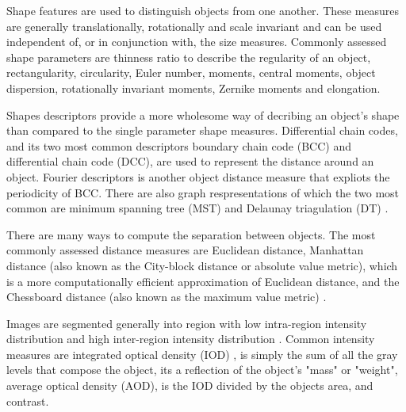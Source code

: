 \begin{definition}
	Shape features are used to distinguish objects from one another.
	These measures are generally translationally, rotationally and scale invariant and can be used independent of, or in conjunction with, the size measures.
	Commonly assessed shape parameters are thinness ratio to describe the regularity of an object, rectangularity, circularity, Euler number, moments, central moments, object dispersion, rotationally invariant moments, Zernike moments and elongation.
\end{definition}

\begin{definition}
	Shapes descriptors provide a more wholesome way of decribing an object's shape than compared to the single parameter shape measures.
	Differential chain codes, and its two most common descriptors boundary chain code (BCC) and differential chain code (DCC), are used to represent the distance around an object.
	Fourier descriptors is another object distance measure that expliots the periodicity of BCC.
	There are also graph respresentations of which the two most common are minimum spanning tree (MST) \citep{Giesen2014,Yuan2009} and Delaunay triagulation (DT) \citep{Kozubek2000,Attali1997}.
\end{definition}

\begin{definition}
	There are many ways to compute the separation between objects.
	The most commonly assessed distance measures are Euclidean distance, Manhattan distance (also known as the City-block distance or absolute value metric), which is a more computationally efficient approximation of Euclidean distance, and the Chessboard distance (also known as the maximum value metric) \citep{French2008,Zinchuk2007}.
\end{definition}

\begin{definition}
	Images are segmented generally into region with low intra-region intensity distribution and high inter-region intensity distribution \citep{Pinkel1986,Meijering2004}.
	Common intensity measures are integrated optical density (IOD) \citep{Loferer1998,Watanabe1991}, is simply the sum of all the gray levels that compose the object, its a reflection of  the object's "mass" or "weight", average optical density (AOD), is the IOD divided by the objects area, and contrast.
\end{definition}

